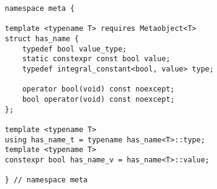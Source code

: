 
\begin{verbatim}
namespace meta {

template <typename T> requires Metaobject<T>
struct has_name {
	typedef bool value_type;
	static constexpr const bool value;
	typedef integral_constant<bool, value> type;

	operator bool(void) const noexcept;
	bool operator(void) const noexcept;
};

template <typename T>
using has_name_t = typename has_name<T>::type;
template <typename T>
constexpr bool has_name_v = has_name<T>::value;

} // namespace meta
\end{verbatim}
